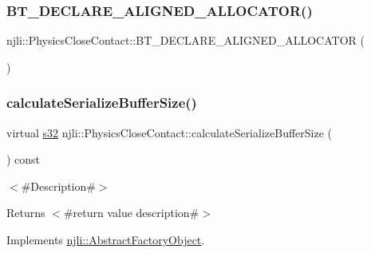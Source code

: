 \subsubsection{\texorpdfstring{B\+T\+\_\+\+D\+E\+C\+L\+A\+R\+E\+\_\+\+A\+L\+I\+G\+N\+E\+D\+\_\+\+A\+L\+L\+O\+C\+A\+T\+O\+R()}{BT\_DECLARE\_ALIGNED\_ALLOCATOR()}}
{\footnotesize\ttfamily njli\+::\+Physics\+Close\+Contact\+::\+B\+T\+\_\+\+D\+E\+C\+L\+A\+R\+E\+\_\+\+A\+L\+I\+G\+N\+E\+D\+\_\+\+A\+L\+L\+O\+C\+A\+T\+OR (\begin{DoxyParamCaption}{ }\end{DoxyParamCaption})\hspace{0.3cm}{\ttfamily [protected]}}

\mbox{\label{classnjli_1_1_physics_close_contact_a4631145f28c1f050dc5ed2740adf48ae}} 
\subsubsection{\texorpdfstring{calculate\+Serialize\+Buffer\+Size()}{calculateSerializeBufferSize()}}
{\footnotesize\ttfamily virtual \mbox{\hyperlink{_util_8h_aa62c75d314a0d1f37f79c4b73b2292e2}{s32}} njli\+::\+Physics\+Close\+Contact\+::calculate\+Serialize\+Buffer\+Size (\begin{DoxyParamCaption}{ }\end{DoxyParamCaption}) const\hspace{0.3cm}{\ttfamily [virtual]}}

$<$\#\+Description\#$>$

\begin{DoxyReturn}{Returns}
$<$\#return value description\#$>$ 
\end{DoxyReturn}


Implements \mbox{\hyperlink{classnjli_1_1_abstract_factory_object_a4763d05bc9dc37c559111f8bb30e1dd8}{njli\+::\+Abstract\+Factory\+Object}}.

\mbox{\label{classnjli_1_1_physics_close_contact_a2853031635fead8faa6ebeab24206613}} 
